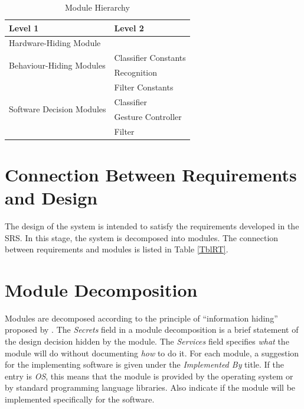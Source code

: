 \documentclass[12pt, titlepage]{article}
\begin{document}
\begin{table}[h!]
\centering
\begin{tabular}{p{} p{}}
\toprule
\textbf{Level 1} & \textbf{Level 2}\\
\midrule

{Hardware-Hiding Module} & ~ \\
\midrule

\multirow{2}{0.3\textwidth}{Behaviour-Hiding Modules} & Classifier Constants\\
~ & Recognition\\
~ & Filter Constants\\
\midrule

\multirow{2}{0.3\textwidth}{Software Decision Modules} & Classifier\\
~ & Gesture Controller\\
~ & Filter\\
\bottomrule






\end{tabular}
\caption{Module Hierarchy}
\label{TblMH}
\end{table}

\section{Connection Between Requirements and Design} \label{SecConnection}

The design of the system is intended to satisfy the requirements developed in
the SRS. In this stage, the system is decomposed into modules. The connection
between requirements and modules is listed in Table \ref{TblRT}.

\section{Module Decomposition} \label{SecMD}

Modules are decomposed according to the principle of ``information hiding''
proposed by \citet{ParnasEtAl1984}. The \emph{Secrets} field in a module
decomposition is a brief statement of the design decision hidden by the
module. The \emph{Services} field specifies \emph{what} the module will do
without documenting \emph{how} to do it. For each module, a suggestion for the
implementing software is given under the \emph{Implemented By} title. If the
entry is \emph{OS}, this means that the module is provided by the operating
system or by standard programming language libraries.  Also indicate if the
module will be implemented specifically for the software.
\end{document}
